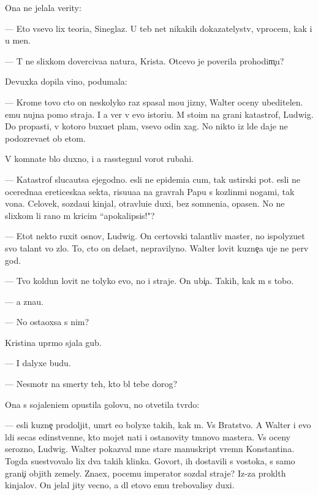 \documentclass[10pt]{book}
\begin{document}
Ona ne jelala verity:

— Eto vsevo lix teori{\y}a, Sineglaz{\yi}{\y}. U teb{\ia} net nikakih dokazatelystv, vprocem, kak i u men{\ia}.

— T{\yi} ne slixkom doverciva{\y}a natura, Krista. Otcevo je poverila prohodim{\c}u?

Devuxka dopila vino, podumala:

— Krome tovo cto on neskolyko raz spasal mo{\y}u jizny, Walter oceny ubeditelen. {\Y}emu nujna pomo{\x} straja. I {\y}a ver{\iu} v {\y}evo istori{\y}u. M{\yi} sto{\y}im na grani katastrof{\yi}, Ludwig. Do propasti, v kotoro{\y} buxu{\y}et plam{\ia}, vsevo odin xag. No nikto iz l{\iu}de{\y} daje ne podozreva{\y}et ob etom.

V komnate b{\yi}lo duxno, i {\y}a rasstegnul vorot rubahi.

— Katastrof{\yi} sluca{\y}utsa {\y}ejegodno. {\Y}esli ne epidemi{\y}a cum{\yi}, tak {\y}ustirski{\y} pot. {\Y}esli ne oceredna{\y}a {\y}ereticeska{\y}a sekta, risu{\y}u{\x}a{\y}a na grav{\iu}rah Papu s kozlin{\yi}mi nogami, tak vo{\y}na. Celovek, sozda{\y}u{\x}i{\y} kinjal{\yi}, otravl{\ia}{\y}u{\x}i{\y}e duxi, bez somneni{\y}a, opasen. No ne slixkom li rano m{\yi} kricim ``apokalipsis!"?

— Etot nekto ruxit osnov{\yi}, Ludwig. On certovski talantliv{\yi}{\y} master, no ispolyzu{\y}et svo{\y} talant vo zlo. To, cto on dela{\y}et, nepravilyno. Walter lovit kuzne{\c}a uje ne perv{\yi}{\y} god.

— Tvo{\y} koldun lovit ne tolyko {\y}evo, no i straje{\y}. On ubi{\y}{\c}a. Takih, kak m{\yi} s tobo{\y}.

— {\Y}a zna{\y}u.

— No osta{\y}oxsa s nim?

Kristina upr{\ia}mo sjala gub{\yi}.

— I dalyxe budu.

— Nesmotr{\ia} na smerty teh, kto b{\yi}l tebe dorog?

Ona s sojaleni{\y}em opustila golovu, no otvetila tv{\e}rdo:

— {\Y}esli kuzne{\c} prodoljit, umr{\e}t {\y}e{\x}o bolyxe takih, kak m{\yi}. Vs{\e} Bratstvo. A Walter i {\y}evo l{\iu}di se{\y}cas {\y}edinstvenn{\yi}{\y}e, kto mojet na{\y}ti i ostanovity t{\e}mnovo mastera. Vs{\e} oceny ser{\y}ozno, Ludwig. Walter pokaz{\yi}val mne star{\yi}{\y}e manuskript{\yi} vrem{\e}n Konstantina. Togda su{\x}estvovalo lix dva takih klinka. Govor{\ia}t, ih dostavili s vostoka, s samo{\y} grani{\c}i objit{\yi}h zemely. Zna{\y}ex, pocemu imperator sozdal straje{\y}? Iz-za prokl{\ia}t{\yi}h kinjalov. On jelal jity vecno, a dl{\ia} etovo {\y}emu trebovalisy duxi.
\end{document}
